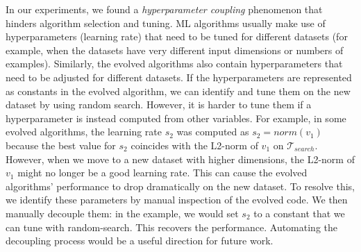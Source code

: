 {In our experiments, we found a \textit{hyperparameter coupling} phenomenon that hinders algorithm selection and tuning. ML algorithms usually make use of hyperparameters (\eg learning rate) that need to be tuned for different datasets (for example, when the datasets have very different input dimensions or numbers of examples). Similarly, the evolved algorithms also contain hyperparameters that need to be adjusted for different datasets. If the hyperparameters are represented as constants in the evolved algorithm, we can identify and tune them on the new dataset by using random search. However, it is harder to tune them if a hyperparameter is instead computed from other variables. For example, in some evolved algorithms, the learning rate $s_2$ was computed as $s_2 = norm(v_1)$ because the best value for $s_2$ coincides with the L2-norm of $v_1$ on $\mathcal{T}_{search}$. However, when we move to a new dataset with higher dimensions, the L2-norm of $v_1$ might no longer be a good learning rate. This can cause the evolved algorithms' performance to drop dramatically on the new dataset. To resolve this, we identify these parameters by manual inspection of the evolved code. We then manually decouple them: in the example, we would set $s_2$ to a constant that we can tune with random-search. This recovers the performance. Automating the decoupling process would be a useful direction for future work.

}  %

